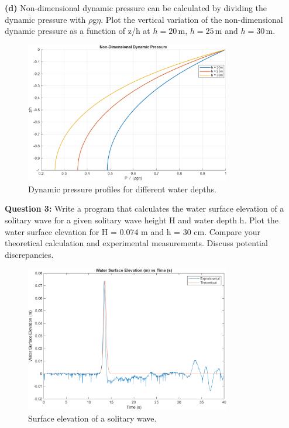 \documentclass[a4paper]{article}
\begin{document}
\textbf{(d)} Non-dimensional dynamic pressure can be calculated by dividing the dynamic pressure with $\rho$g$\eta$. Plot the vertical variation of the non-dimensional dynamic pressure as a function of z/h at \( h = 20 \, \text{m} \), \( h = 25 \, \text{m} \) and \( h = 30 \, \text{m} \).
\vspace{0.3cm}

\begin{figure}[H]
    \centering
    \includegraphics[width=0.8\textwidth]{CE591HW1-Q1d.png}
    \caption{\small Dynamic pressure profiles for different water depths.}
    \label{fig:plot2d}
\end{figure} 
\vspace{0.3cm}


\vspace{0.5cm}

\textbf{Question 3:} Write a program that calculates the water surface elevation of a solitary wave for a given solitary wave height H and water depth h. Plot the water surface elevation for H = 0.074 m and h = 30 cm. Compare your theoretical calculation and experimental measurements. Discuss potential discrepancies.
\vspace{0.3cm}

\begin{figure}[H]
    \centering
    \includegraphics[width=0.8\textwidth]{CE591HW1-Q3.png}
    \caption{\small Surface elevation of a solitary wave.}
    \label{fig:plot3}
\end{figure} 
\vspace{0.3cm}
\end{document}
